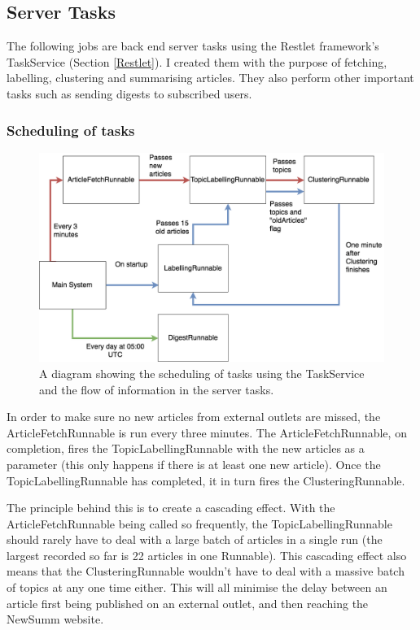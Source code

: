 \documentclass[12pt]{article}
\begin{document}
\subsection{Server Tasks}

\label{ServerTasks}

The following jobs are back end server tasks using the Restlet \cite{restlet} framework's TaskService (Section \ref{Restlet}). I created them with the purpose of fetching, labelling, clustering and summarising articles. They also perform other important tasks such as sending digests to subscribed users.  

\subsubsection{Scheduling of tasks}

\begin{figure}[ht!]
  \centering
    \includegraphics[width=\textwidth]{TaskService.png}
   \caption[A diagram showing the scheduling of tasks]{A diagram showing the scheduling of tasks using the TaskService and the flow of information in the server tasks.}
   \label{servertasks}
\end{figure} 

In order to make sure no new articles from external outlets are missed, the ArticleFetchRunnable is run every three minutes. The ArticleFetchRunnable, on completion, fires the TopicLabellingRunnable with the new articles as a parameter (this only happens if there is at least one new article). Once the TopicLabellingRunnable has completed, it in turn fires the ClusteringRunnable. 

\begin{sloppypar}
The principle behind this is to create a cascading effect. With the ArticleFetchRunnable being called so frequently, the TopicLabellingRunnable should rarely have to deal with a large batch of articles in a single run (the largest recorded so far is 22 articles in one Runnable). This cascading effect also means that the ClusteringRunnable wouldn't have to deal with a massive batch of topics at any one time either. This will all minimise the delay between an article first being published on an external outlet, and then reaching the NewSumm website.
\end{sloppypar}
\end{document}
